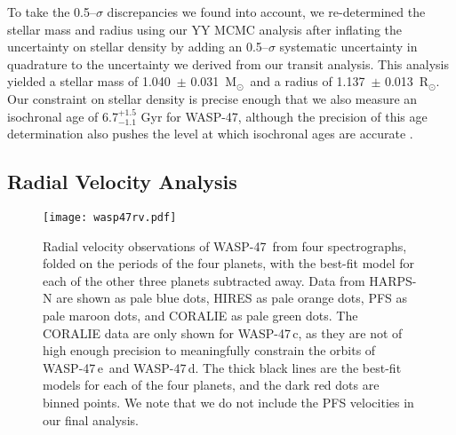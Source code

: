 \documentclass{emulateapj}
\newcommand{\thisstar}{WASP-47}
\newcommand{\thissecondplanet}{WASP-47\,e}
\newcommand{\thisthirdplanet}{WASP-47\,d}
\newcommand{\thisfourthplanet}{WASP-47\,c}
\newcommand{\msun}{M$_\odot$}
\newcommand{\rsun}{R$_\odot$}
\newcommand{\mst}{1.040}
\newcommand{\umst}{0.031}
\newcommand{\rst}{1.137}
\newcommand{\urst}{0.013}
\begin{document}
To take the 0.5--$\sigma$ discrepancies we found into account, we re-determined the stellar mass and radius using our YY MCMC analysis after inflating the uncertainty on stellar density by adding an 0.5--$\sigma$ systematic uncertainty in quadrature to the uncertainty we derived from our transit analysis. This analysis yielded a stellar mass of \mst\ $\pm$ \umst\ \msun\ and a radius of \rst\ $\pm$ \urst\ \rsun. Our constraint on stellar density is precise enough that we also measure an isochronal age of 6.7$^{+1.5}_{-1.1}$ Gyr for \thisstar, although the precision of this age determination also pushes the level at which isochronal ages are accurate \citep[isochronal ages can have systematic errors of up to 25\%, ][]{torresmasses}. 




\subsection{Radial Velocity Analysis}
\label{sec:rv_analysis}

\begin{figure}[ht!] %
   \centering
   \texttt{[image: wasp47rv.pdf]} 
   \caption{Radial velocity observations of \thisstar\ from four spectrographs, folded on the periods of the four planets, with the best-fit model for each of the other three planets subtracted away. Data from HARPS-N are shown as pale blue dots, HIRES as pale orange dots, PFS as pale maroon dots, and CORALIE as pale green dots. The CORALIE data are only shown for \thisfourthplanet, as they are not of high enough precision to meaningfully constrain the orbits of \thissecondplanet\ and \thisthirdplanet. The thick black lines are the best-fit models for each of the four planets, and the dark red dots are binned points. We note that we do not include the PFS velocities in our final analysis.}
   \label{rvphase}
\end{figure}
\end{document}
